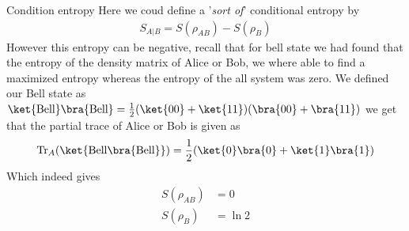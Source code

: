 \begin{parag}{Condition entropy}
    Here we coud define a '\textit{sort of}' conditional entropy by 
	\begin{align*} 
		S_{A|B} =  S\left(\rho_{AB}\right)  - S\left(\rho_B\right)
	\end{align*}
	However this entropy can be negative, recall that for bell state we had found that the entropy of the density matrix of Alice or Bob, we where able to find a maximized entropy whereas the entropy of the all system was zero. We defined our Bell state as $\ket{\text{Bell}}\bra{\text{Bell}} = \frac{1}{2}\left(\ket{00} + \ket{11}\right)\left(\bra{00}+\bra{11}\right)$ we get that the partial trace of Alice or Bob is given as 
	\begin{align*} 
		\text{Tr}_A \left(\ket{\text{Bell}\bra{\text{Bell}}}\right) = \frac{1}{2}\left(\ket{0}\bra{0} + \ket{1}\bra{1}\right)
	\end{align*}
	Which indeed gives 
	\begin{align*} 
		S\left(\rho_{AB}\right)  &= 0\\
		S\left(\rho_B\right) &= \ln 2
	\end{align*}
\end{parag}

